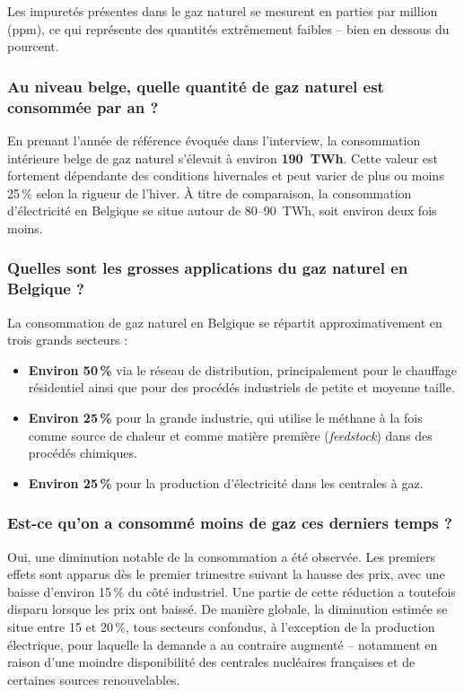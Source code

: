 Les impuretés présentes dans le gaz naturel se mesurent en parties par million (ppm), ce qui représente des quantités extrêmement faibles -- bien en dessous du pourcent.

\subsubsection{Au niveau belge, quelle quantité de gaz naturel est consommée par an ?}

En prenant l'année de référence évoquée dans l'interview, la consommation intérieure belge de gaz naturel s'élevait à environ \textbf{190~TWh}. Cette valeur est fortement dépendante des conditions hivernales et peut varier de plus ou moins 25\,\% selon la rigueur de l'hiver. À titre de comparaison, la consommation d'électricité en Belgique se situe autour de 80--90~TWh, soit environ deux fois moins.

\subsubsection{Quelles sont les grosses applications du gaz naturel en Belgique ?}

La consommation de gaz naturel en Belgique se répartit approximativement en trois grands secteurs :
\begin{itemize}
    \item \textbf{Environ 50\,\%} via le réseau de distribution, principalement pour le chauffage résidentiel ainsi que pour des procédés industriels de petite et moyenne taille.
    \item \textbf{Environ 25\,\%} pour la grande industrie, qui utilise le méthane à la fois comme source de chaleur et comme matière première (\textit{feedstock}) dans des procédés chimiques.
    \item \textbf{Environ 25\,\%} pour la production d'électricité dans les centrales à gaz.
\end{itemize}

\subsubsection{Est-ce qu'on a consommé moins de gaz ces derniers temps ?}

Oui, une diminution notable de la consommation a été observée. Les premiers effets sont apparus dès le premier trimestre suivant la hausse des prix, avec une baisse d'environ 15\,\% du côté industriel. Une partie de cette réduction a toutefois disparu lorsque les prix ont baissé. De manière globale, la diminution estimée se situe entre 15 et 20\,\%, tous secteurs confondus, à l'exception de la production électrique, pour laquelle la demande a au contraire augmenté -- notamment en raison d'une moindre disponibilité des centrales nucléaires françaises et de certaines sources renouvelables.

